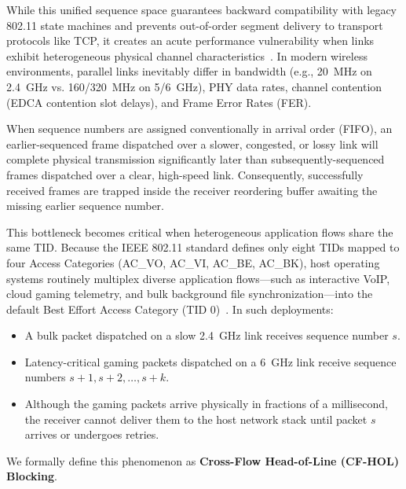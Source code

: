 \documentclass[10pt,journal,compsoc]{IEEEtran}
\begin{document}
While this unified sequence space guarantees backward compatibility with legacy 802.11 state machines and prevents out-of-order segment delivery to transport protocols like TCP, it creates an acute performance vulnerability when links exhibit heterogeneous physical channel characteristics~\cite{carreno2021multi,oliveira2026characterizing}. In modern wireless environments, parallel links inevitably differ in bandwidth (e.g., 20~MHz on 2.4~GHz vs. 160/320~MHz on 5/6~GHz), PHY data rates, channel contention (EDCA contention slot delays), and Frame Error Rates (FER).

When sequence numbers are assigned conventionally in arrival order (FIFO), an earlier-sequenced frame dispatched over a slower, congested, or lossy link will complete physical transmission significantly later than subsequently-sequenced frames dispatched over a clear, high-speed link. Consequently, successfully received frames are trapped inside the receiver reordering buffer awaiting the missing earlier sequence number.

This bottleneck becomes critical when heterogeneous application flows share the same TID. Because the IEEE 802.11 standard defines only eight TIDs mapped to four Access Categories (AC\_VO, AC\_VI, AC\_BE, AC\_BK), host operating systems routinely multiplex diverse application flows---such as interactive VoIP, cloud gaming telemetry, and bulk background file synchronization---into the default Best Effort Access Category (TID 0)~\cite{carreno2021multi,sangeetha2026performance}. In such deployments:
\begin{itemize}
    \item A bulk packet dispatched on a slow 2.4~GHz link receives sequence number $s$.
    \item Latency-critical gaming packets dispatched on a 6~GHz link receive sequence numbers $s+1, s+2, \dots, s+k$.
    \item Although the gaming packets arrive physically in fractions of a millisecond, the receiver cannot deliver them to the host network stack until packet $s$ arrives or undergoes retries.
\end{itemize}
We formally define this phenomenon as \textbf{Cross-Flow Head-of-Line (CF-HOL) Blocking}.
\end{document}
